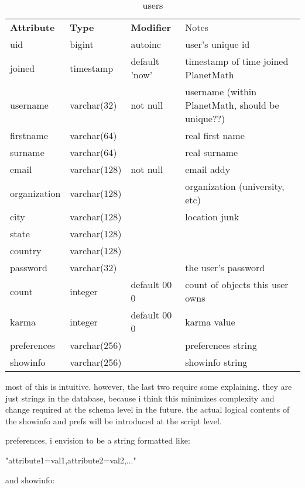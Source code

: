\begin{table}
\begin{center}
\begin{tabular}{llll}
{\bf Attribute } & {\bf Type} & {\bf Modifier} & Notes \\
uid          & bigint       & autoinc       & user's unique id \\
joined       & timestamp    & default 'now' & timestamp of time joined PlanetMath \\
username     & varchar(32)  & not null      & username (within PlanetMath, should be unique??) \\
firstname    & varchar(64)  &               & real first name \\
surname      & varchar(64)  &               & real surname \\
email        & varchar(128) & not null      & email addy \\
organization & varchar(128) &               & organization (university, etc) \\
city         & varchar(128) &               & location junk \\
state        & varchar(128) &               & \\
country      & varchar(128) &               & \\
password     & varchar(32)  &               & the user's password \\
count        & integer      & default 00 0  & count of objects this user owns \\
karma        & integer      & default 00 0  & karma value \\
preferences  & varchar(256) &               & preferences string \\
showinfo     & varchar(256) &               & showinfo string 
\end{tabular}
\end{center}
\caption{users}
\end{table}

most of this is intuitive.  however, the last two require some explaining. they are just strings in the database, because i think this minimizes complexity and change required at the schema level in the future. the actual logical contents of the showinfo and prefs will be introduced at the script level.

preferences, i envision to be a string formatted like:
 
 "attribute1=val1,attribute2=val2,..."

and showinfo:


